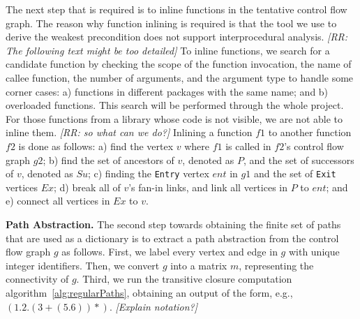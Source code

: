 The next step that is required is to inline functions in the tentative control flow graph.
The reason why function inlining is required is that the tool we use to derive
the weakest precondition does not support interprocedural analysis.
{\em [RR: The following text might be too detailed]}
To inline functions, we search for
a candidate function by checking the scope of the function invocation, the name of callee
function, the number of arguments, and the argument type to handle some corner cases: a)
functions in different packages with the same name; and b) overloaded functions. This search
will be performed through the whole project. For those functions from a library whose code is
not visible, we are not able to inline them. {\em [RR: so what can we do?]}
Inlining a function $f1$ to another function $f2$
is done as follows: a) find the vertex $v$ where $f1$ is called in $f2$'s control flow
graph $g2$; b) find the set of ancestors of $v$, denoted as $P$, and the set of successors of $v$, denoted as $Su$; 
c) finding the \texttt{Entry} vertex $ent$ in $g1$ and the set of \texttt{Exit} vertices $Ex$; d) break
all of $v$'s fan-in links, and link all vertices in $P$ to $ent$; and e) connect all vertices in $Ex$ to $v$.

{\bf Path Abstraction.} The second step towards obtaining the finite set of paths that are used
as a dictionary is to
extract a path abstraction from the control flow graph $g$ as follows. First, we label every vertex and edge
in $g$ with unique integer identifiers. Then, we convert $g$ into 
a matrix $m$, representing the connectivity of $g$. Third, we run the 
transitive closure computation algorithm~\ref{alg:regularPaths}, obtaining an output of the
form, e.g., $(1.2.(3+(5.6))*)$. {\em [Explain notation?]}

